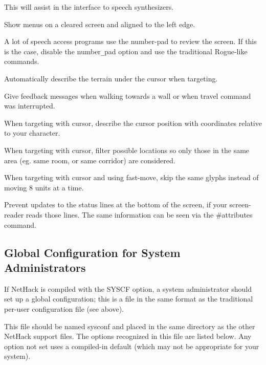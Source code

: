 This will assist in the interface to speech synthesizers.
\item[\ib{nomenu\verb+_+overlay}]
Show menus on a cleared screen and aligned to the left edge.
\item[\ib{number\verb+_+pad}]
A lot of speech access programs use the number-pad to review the screen.
If this is the case, disable the number\verb+_+pad option and use the traditional
Rogue-like commands.
\item[\ib{autodescribe}]
Automatically describe the terrain under the cursor when targeting.
\item[\ib{mention\verb+_+walls}]
Give feedback messages when walking towards a wall or when travel command
was interrupted.
\item[\ib{whatis\verb+_+coord:compass}]
When targeting with cursor, describe the cursor position with coordinates
relative to your character.
\item[\ib{whatis\verb+_+filter:area}]
When targeting with cursor, filter possible locations so only those in
the same area (eg. same room, or same corridor) are considered.
\item[\ib{whatis\verb+_+moveskip}]
When targeting with cursor and using fast-move, skip the same glyphs instead
of moving 8 units at a time.
\item[\ib{nostatus\verb+_+updates}]
Prevent updates to the status lines at the bottom of the screen, if
your screen-reader reads those lines. The same information can be
seen via the #attributes command.
\elist

\subsection*{Global Configuration for System Administrators}

If NetHack is compiled with the SYSCF option, a system administrator
should set up a global configuration; this is a file in the 
same format as the traditional per-user configuration file (see above).

This file should be named sysconf and placed in the same directory as
the other NetHack support files.
The options recognized in this file are listed below. Any option not
set uses a compiled-in default (which may not be appropriate for your
system).

